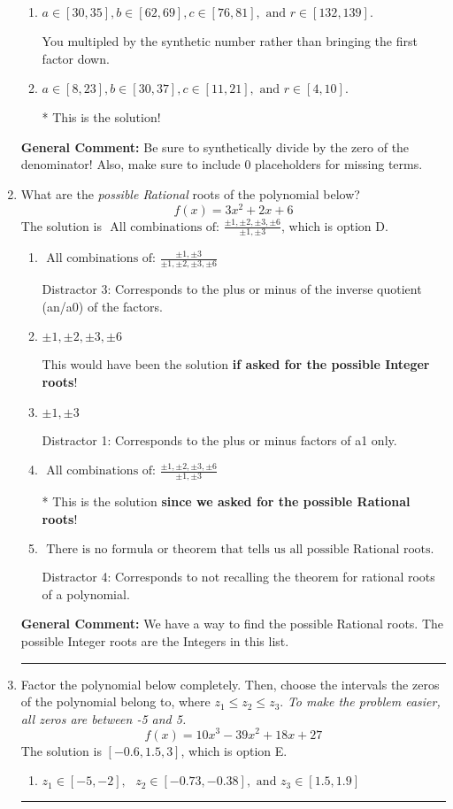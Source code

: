 \documentclass{extbook}[14pt]
\newcommand{\litem}[1]{\item #1

\rule{\textwidth}{0.4pt}}
\begin{document}
\begin{enumerate}
{\begin{enumerate}[label=\Alph*.]
 You multipled by the synthetic number and subtracted rather than adding during synthetic division.
\item \( a \in [30, 35], b \in [62, 69], c \in [76, 81], \text{ and } r \in [132, 139]. \)

 You multipled by the synthetic number rather than bringing the first factor down.
\item \( a \in [8, 23], b \in [30, 37], c \in [11, 21], \text{ and } r \in [4, 10]. \)

* This is the solution!
\end{enumerate}

\textbf{General Comment:} Be sure to synthetically divide by the zero of the denominator! Also, make sure to include 0 placeholders for missing terms.
}
\litem{
What are the \textit{possible Rational} roots of the polynomial below?
\[ f(x) = 3x^{2} +2 x + 6 \]The solution is \( \text{ All combinations of: }\frac{\pm 1,\pm 2,\pm 3,\pm 6}{\pm 1,\pm 3} \), which is option D.\begin{enumerate}[label=\Alph*.]
\item \( \text{ All combinations of: }\frac{\pm 1,\pm 3}{\pm 1,\pm 2,\pm 3,\pm 6} \)

 Distractor 3: Corresponds to the plus or minus of the inverse quotient (an/a0) of the factors. 
\item \( \pm 1,\pm 2,\pm 3,\pm 6 \)

This would have been the solution \textbf{if asked for the possible Integer roots}!
\item \( \pm 1,\pm 3 \)

 Distractor 1: Corresponds to the plus or minus factors of a1 only.
\item \( \text{ All combinations of: }\frac{\pm 1,\pm 2,\pm 3,\pm 6}{\pm 1,\pm 3} \)

* This is the solution \textbf{since we asked for the possible Rational roots}!
\item \( \text{ There is no formula or theorem that tells us all possible Rational roots.} \)

 Distractor 4: Corresponds to not recalling the theorem for rational roots of a polynomial.
\end{enumerate}

\textbf{General Comment:} We have a way to find the possible Rational roots. The possible Integer roots are the Integers in this list.
}
\litem{
Factor the polynomial below completely. Then, choose the intervals the zeros of the polynomial belong to, where $z_1 \leq z_2 \leq z_3$. \textit{To make the problem easier, all zeros are between -5 and 5.}
\[ f(x) = 10x^{3} -39 x^{2} +18 x + 27 \]The solution is \( [-0.6, 1.5, 3] \), which is option E.\begin{enumerate}[label=\Alph*.]
\item \( z_1 \in [-5, -2], \text{   }  z_2 \in [-0.73, -0.38], \text{   and   } z_3 \in [1.5, 1.9] \)


\end{enumerate}}
\end{enumerate}
\end{document}
